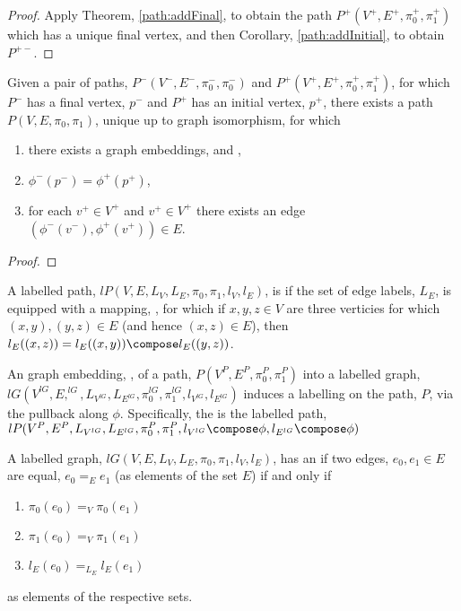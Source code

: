 \begin{proof}
Apply Theorem, \ref{path:addFinal}, to obtain the path $P^+(V^+, E^+, \pi^+_0, \pi^+_1)$
which has a unique final vertex, and then Corollary, \ref{path:addInitial}, to obtain
$P^{+-}$.
\end{proof}

\begin{theorem}
Given a pair of paths, $P^-(V^-, E^-, \pi^-_0, \pi^-_0)$ and $P^+(V^+, E^+, \pi^+_0,
\pi^+_1)$, for which $P^-$ has a final vertex, $p^-$ and $P^+$ has an initial vertex,
$p^+$, there exists a path $P(V, E, \pi_0, \pi_1)$, unique up to graph isomorphism, for
which
\begin{enumerate}
\item there exists a graph embeddings,  and ,
\item $\phi^-(p^-) = \phi^+(p^+)$,
\item for each $v^+ \in V^+$ and $v^+ \in V^+$ there exists an edge $(\phi^-(v^-), 
\phi^+(v^+)) \in E$.
\end{enumerate}
\end{theorem}

\begin{proof}
\end{proof}


\begin{definition}
A labelled path, $lP(V, E, L_V, L_E, \pi_0, \pi_1, l_V, l_E)$, is  if the set of edge labels, $L_E$, is equipped with a mapping,
, for which if $x, y, z \in V$ are three verticies for 
which $(x,y), (y,z) \in E$ (and hence $(x,z) \in E$), then $l_E((x,z)) = l_E((x,y)) \compose 
l_E((y,z))$.
\end{definition}

\begin{definition}
An graph embedding, , of a path, $P(V^P, E^P, \pi^P_0, \pi^P_1)$ into a 
labelled graph, $lG(V^{lG}, E,^{lG}, L_{V^{lG}}, L_{E^{lG}}, \pi^{lG}_0, \pi^{lG}_1, 
l_{V^{lG}}, l_{E^{lG}})$ induces a labelling on the path, $P$, via the pullback along 
$\phi$. Specifically, the  is the labelled path, $lP(V^P, E^P, 
L_{V^{lG}}, L_{E^{lG}}, \pi^P_0, \pi^P_1, l_{V^{lG}} \compose \phi, l_{E^{lG}} \compose 
\phi)$
\end{definition}

\begin{definition}
A labelled graph, $lG(V, E, L_V, L_E, \pi_0, \pi_1, l_V, l_E)$, has an  if two edges, $e_0, e_1 \in E$ are equal, $e_0 =_E e_1$ (as elements of
the set $E$) if and only if
\begin{enumerate}
\item $\pi_0(e_0) =_V \pi_0(e_1)$
\item $\pi_1(e_0) =_V \pi_1(e_1)$
\item $l_E(e_0) =_{L_E} l_E(e_1)$
\end{enumerate}
as elements of the respective sets.
\end{definition}

